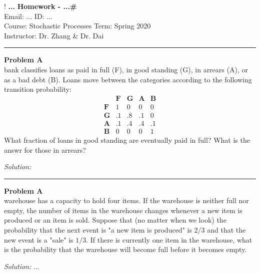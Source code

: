 \documentclass[a4paper, 11pt]{article}
\newenvironment{problem}[2][Problem]
    { \begin{mdframed}[backgroundcolor=gray!20] \textbf{#1 #2} \\}
    {  \end{mdframed}}
\newenvironment{solution}
    {\textit{Solution:}}
    {}
\begin{document}
!
\large\textbf{...} \hfill \textbf{Homework - ...\#}   \\
Email: ... \hfill ID: ... \\
\normalsize Course: Stochastic Processes  \hfill Term: Spring 2020\\
Instructor: Dr. Zhang \& Dr. Dai \\%
\noindent\rule{7in}{2.8pt}
\begin{problem}{1.56}
A bank classifies loans as paid in full (F), in good standing (G), in arrears
(A), or as a bad debt (B). Loans move between the categories according to the following transition probability:
$$\begin{array}{lllll} 
& \mathbf{F} & \mathbf{G} & \mathbf{A} & \mathbf{B} \\
\mathbf{F} & 1 & 0 & 0 & 0 \\
\mathbf{G} & .1 & .8 & .1 & 0 \\
\mathbf{A} & .1 & .4 & .4 & .1 \\
\mathbf{B} & 0 & 0 & 0 & 1
\end{array}$$
What fraction of loans in good standing are eventually paid in full? What is the answr for those in arrears?

\end{problem}
\begin{solution}

\end{solution} 
\noindent\rule{7in}{2.8pt}


\begin{problem}{1.57}
A warehouse has a capacity to hold four items. If the warehouse is neither full nor empty, the number of items in the warehouse changes whenever a new item is produced or an item is sold. Suppose that (no matter when we look) the probability that the next event is "a new item is produced" is $2 / 3$ and that the new event is a "sale" is $1/3$. If there is currently one item in the warehouse, what is the probability that the warehouse will become full before it becomes empty.

\end{problem}
\begin{solution}
...
\end{solution} 
\end{document}
